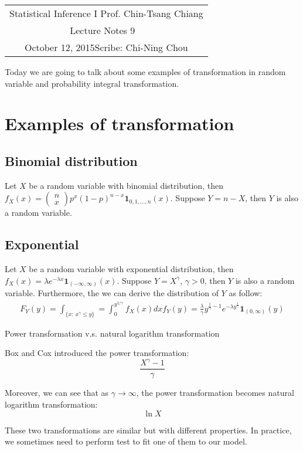 \documentclass[11pt]{article}
\newcommand{\scribe}{Chi-Ning Chou}
\newcommand{\lecnum}{9}
\newcommand{\lecdate}{October 12, 2015}
\begin{document}
	
	\begin{center}
		\renewcommand{\arraystretch}{2}
		\begin{bfseries}
			\begin{tabular}{|c|}
				\hline
				Statistical Inference I \hfill Prof. Chin-Tsang Chiang\\
				\hspace{15em} {\large Lecture Notes \lecnum} \hspace{15em}\ \\
				\lecdate \hfill Scribe: \scribe\\
				\hline
			\end{tabular}
			\renewcommand{\arraystretch}{1}
		\end{bfseries}
	\end{center}
	
Today we are going to talk about some examples of transformation in random variable and probability integral transformation.

\section{Examples of transformation}
\subsection{Binomial distribution}
Let $X$ be a random variable with binomial distribution, then $f_X(x) = \left(\begin{array}{c}
n\\
x
\end{array}\right)p^x(1-p)^{n-x}\mathbf{1}_{0,1,...,n}(x)$. Suppose $Y=n-X$, then $Y$ is also a random variable.

\subsection{Exponential}
Let $X$ be a random variable with exponential distribution, then $f_X(x) = \lambda e^{-\lambda x}\mathbf{1}_{(-\infty,\infty)}(x)$. Suppose $Y=X^{\gamma}$, $\gamma>0$, then $Y$ is also a random variable. Furthermore, the we can derive the distribution of $Y$ as follow:
\begin{align*}
F_Y(y) = \int_{\{x:\ x^{\gamma}\leq y \}} = \int_0^{y^{1/\gamma}}f_X(x)dx
f_Y(y) = \frac{\lambda}{\gamma}y^{\frac{1}{\gamma}-1}e^{-\lambda y^{\frac{1}{\gamma}}}\mathbf{1}_{(0,\infty)}(y)
\end{align*}

\begin{remark}{Power transformation v.s. natural logarithm transformation}
	
Box and Cox introduced the power transformation:
$$\frac{X^{\gamma}-1}{\gamma}$$

Moreover, we can see that as $\gamma\rightarrow\infty$, the power transformation becomes natural logarithm transformation:
$$\ln X$$

These two transformations are similar but with different properties. In practice, we sometimes need to perform test to fit one of them to our model.
\end{remark}
\end{document}
